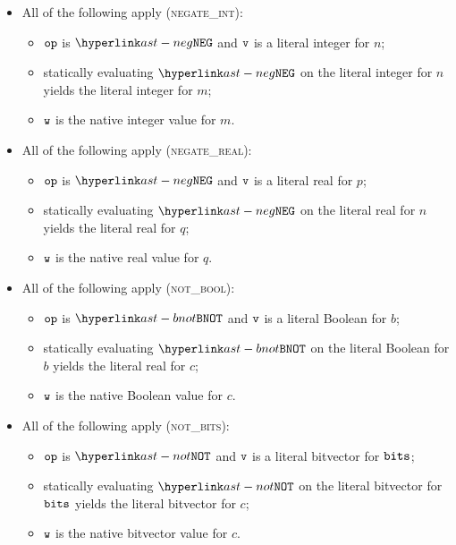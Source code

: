 \begin{itemize}
  \item All of the following apply (\textsc{negate\_int}):
  \begin{itemize}
    \item $\texttt{op}$ is $\NEG$ and $\texttt{v}$ is a literal integer for $n$;
    \item statically evaluating $\NEG$ on the literal integer for $n$ yields the
          literal integer for $m$;
    \item $\texttt{w}$ is the native integer value for $m$.
  \end{itemize}

  \item All of the following apply (\textsc{negate\_real}):
  \begin{itemize}
    \item $\texttt{op}$ is $\NEG$ and $\texttt{v}$ is a literal real for $p$;
    \item statically evaluating $\NEG$ on the literal real for $n$ yields the
          literal real for $q$;
    \item $\texttt{w}$ is the native real value for $q$.
  \end{itemize}

  \item All of the following apply (\textsc{not\_bool}):
  \begin{itemize}
    \item $\texttt{op}$ is $\BNOT$ and $\texttt{v}$ is a literal Boolean for $b$;
    \item statically evaluating $\BNOT$ on the literal Boolean for $b$ yields the
          literal real for $c$;
    \item $\texttt{w}$ is the native Boolean value for $c$.
  \end{itemize}

  \item All of the following apply (\textsc{not\_bits}):
  \begin{itemize}
    \item $\texttt{op}$ is $\NOT$ and $\texttt{v}$ is a literal bitvector for $\texttt{bits}$;
    \item statically evaluating $\NOT$ on the literal bitvector for $\texttt{bits}$ yields the
          literal bitvector for $c$;
    \item $\texttt{w}$ is the native bitvector value for $c$.
  \end{itemize}
\end{itemize}

